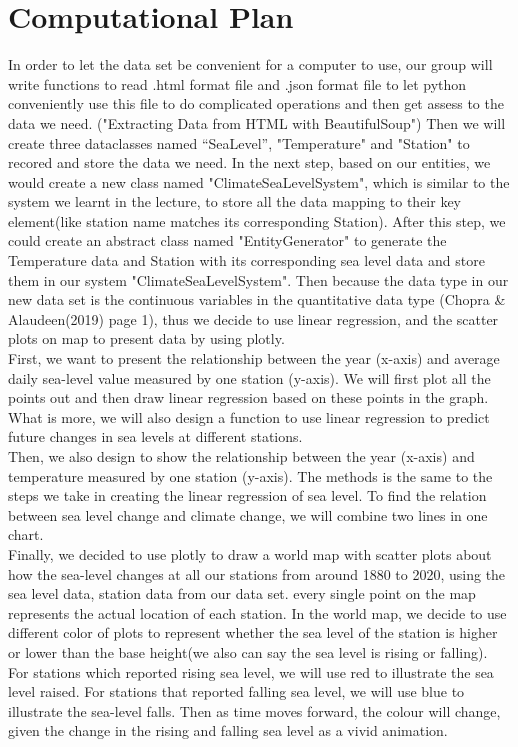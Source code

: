 \documentclass[fontsize=11pt]{article}
\begin{document}
    \section*{Computational Plan}

    In order to let the data set be convenient for a computer to use, our group will write functions to read .html format file and .json format file to let python conveniently use this file to do complicated operations and then get assess to the data we need. ("Extracting Data from HTML with BeautifulSoup") Then we will create three dataclasses named “SeaLevel”, "Temperature" and "Station" to recored and store the data we need. In the next step, based on our entities, we would create a new class named "ClimateSeaLevelSystem", which is similar to the system we learnt in the lecture, to store all the data mapping to their key element(like station name matches its corresponding Station). After this step, we could create an abstract class named "EntityGenerator" to generate the Temperature data and Station with its corresponding sea level data and store them in our system "ClimateSeaLevelSystem". Then because the data type in our new data set is the continuous variables in the quantitative data type (Chopra \& Alaudeen(2019) page 1), thus we decide to use linear regression, and the scatter plots on map to present data by using plotly.\\
    First, we want to present the relationship between the year (x-axis) and average daily sea-level value measured by one station (y-axis). We will first plot all the points out and then draw linear regression based on these points in the graph. What is more, we will also design a function to use linear regression to predict future changes in sea levels at different stations. \\
    Then, we also design to show the relationship between the year (x-axis) and temperature measured by one station (y-axis). The methods is the same to the steps we take in creating the linear regression of sea level. To find the relation between sea level change and climate change, we will combine two lines in one chart. \\
    Finally, we decided to use plotly to draw a world map with scatter plots about how the sea-level changes at all our stations from around 1880 to 2020, using the sea level data, station data from our data set. every single point on the map represents the actual location of each station. In the world map, we decide to use different color of plots to represent whether the sea level of the station is higher or lower than the base height(we also can say the sea level is rising or falling). For stations which reported rising sea level, we will use red to illustrate the sea level raised. For stations that reported falling sea level, we will use blue to illustrate the sea-level falls. Then as time moves forward, the colour will change, given the change in the rising and falling sea level as a vivid animation.\\
\end{document}
